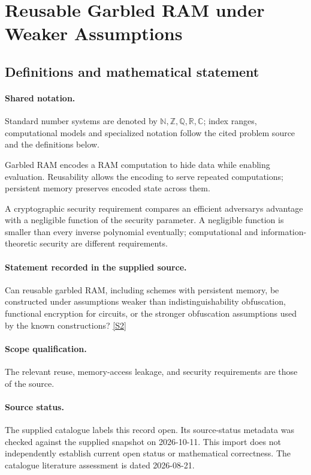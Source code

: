 \documentclass[11pt]{article}
\newcommand{\sref}[2]{\hyperlink{source:#1:#2}{[S#2]}}
\begin{document}
\section{Reusable Garbled RAM under Weaker Assumptions}\label{statement}

\subsection{Definitions and mathematical statement}

\paragraph{Shared notation.}Standard number systems are denoted by $\mathbb N,\mathbb Z,\mathbb Q,\mathbb R,\mathbb C$; index ranges, computational models and specialized notation follow the cited problem source and the definitions below.


Garbled RAM encodes a RAM computation to hide data while enabling evaluation. Reusability allows the encoding to serve repeated computations; persistent memory preserves encoded state across them.

A cryptographic security requirement compares an efficient adversary\textquotesingle s advantage with a negligible function of the security parameter. A negligible function is smaller than every inverse polynomial eventually; computational and information-theoretic security are different requirements.
\paragraph{Statement recorded in the supplied source.}
Can reusable garbled RAM, including schemes with persistent memory, be constructed under assumptions weaker than indistinguishability obfuscation, functional encryption for circuits, or the stronger obfuscation assumptions used by the known constructions? \sref{statement}{2}
\paragraph{Scope qualification.}
The relevant reuse, memory-access leakage, and security requirements are those of the source.
\paragraph{Source status.}
The supplied catalogue labels this record open. Its source-status metadata was checked against the supplied snapshot on 2026-10-11. This import does not independently establish current open status or mathematical correctness. The catalogue literature assessment is dated 2026-08-21.
\end{document}
